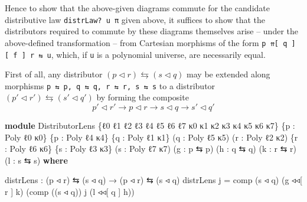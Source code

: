 \documentclass[
  11pt,
  oneside,
  article]{memoir}
\newenvironment{Shaded}{}{}
\newcommand{\KeywordTok}[1]{\textcolor[rgb]{0.00,0.44,0.13}{\textbf{#1}}}
\newcommand{\NormalTok}[1]{#1}
\newcommand{\OtherTok}[1]{\textcolor[rgb]{0.00,0.44,0.13}{#1}}
\theoremstyle{definition}
\theoremstyle{plain}
\newcommand{\0}{\textsf{0}}
\newcommand{\1}{\tn{\textsf{1}}}
\begin{document}
Hence to show that the above-given diagrams commute for the candidate
distributive law \texttt{distrLaw?\ u\ π} given above, it suffices to
show that the distributors required to commute by these diagrams
themselves arise -- under the above-defined transformation -- from
Cartesian morphisms of the form
\texttt{p\ ⇈{[}\ q\ {]}{[}\ f\ {]}\ r\ ⇆\ u}, which, if \texttt{u} is a
polynomial universe, are necessarily equal.

First of all, any distributor
\((p \triangleleft r) \leftrightarrows (s \triangleleft q)\) may be
extended along morphisms
\texttt{p\textquotesingle{}\ ⇆\ p,\ q\ ⇆\ q\textquotesingle{},\ r\textquotesingle{}\ ⇆\ r,\ s\ ⇆\ s\textquotesingle{}}
to a distributor
\((p' \triangleleft r') \leftrightarrows (s' \triangleleft q')\) by
forming the composite \[
p' \triangleleft r' \xrightarrow{} p \triangleleft r \xrightarrow{} s \triangleleft q \xrightarrow{} s' \triangleleft q'
\]

\begin{Shaded}
\begin{Highlighting}[]
\KeywordTok{module}\NormalTok{ DistributorLens }\OtherTok{\{}\NormalTok{ℓ0 ℓ1 ℓ2 ℓ3 ℓ4 ℓ5 ℓ6 ℓ7}
\NormalTok{                        κ0 κ1 κ2 κ3 κ4 κ5 κ6 κ7}\OtherTok{\}}
                       \OtherTok{\{}\NormalTok{p }\OtherTok{:}\NormalTok{ Poly ℓ0 κ0}\OtherTok{\}} \OtherTok{\{}\NormalTok{p\textquotesingle{} }\OtherTok{:}\NormalTok{ Poly ℓ4 κ4}\OtherTok{\}}
                       \OtherTok{\{}\NormalTok{q }\OtherTok{:}\NormalTok{ Poly ℓ1 κ1}\OtherTok{\}} \OtherTok{(}\NormalTok{q\textquotesingle{} }\OtherTok{:}\NormalTok{ Poly ℓ5 κ5}\OtherTok{)}
                       \OtherTok{(}\NormalTok{r }\OtherTok{:}\NormalTok{ Poly ℓ2 κ2}\OtherTok{)} \OtherTok{\{}\NormalTok{r\textquotesingle{} }\OtherTok{:}\NormalTok{ Poly ℓ6 κ6}\OtherTok{\}}
                       \OtherTok{\{}\NormalTok{s }\OtherTok{:}\NormalTok{ Poly ℓ3 κ3}\OtherTok{\}} \OtherTok{(}\NormalTok{s\textquotesingle{} }\OtherTok{:}\NormalTok{ Poly ℓ7 κ7}\OtherTok{)}
                       \OtherTok{(}\NormalTok{g }\OtherTok{:}\NormalTok{ p\textquotesingle{} ⇆ p}\OtherTok{)} \OtherTok{(}\NormalTok{h }\OtherTok{:}\NormalTok{ q ⇆ q\textquotesingle{}}\OtherTok{)} 
                       \OtherTok{(}\NormalTok{k }\OtherTok{:}\NormalTok{ r\textquotesingle{} ⇆ r}\OtherTok{)} \OtherTok{(}\NormalTok{l }\OtherTok{:}\NormalTok{ s ⇆ s\textquotesingle{}}\OtherTok{)} \KeywordTok{where}

\NormalTok{    distrLens }\OtherTok{:} \OtherTok{(}\NormalTok{p ◃ r}\OtherTok{)}\NormalTok{ ⇆ }\OtherTok{(}\NormalTok{s ◃ q}\OtherTok{)} \OtherTok{→} \OtherTok{(}\NormalTok{p\textquotesingle{} ◃ r\textquotesingle{}}\OtherTok{)}\NormalTok{ ⇆ }\OtherTok{(}\NormalTok{s\textquotesingle{} ◃ q\textquotesingle{}}\OtherTok{)}
\NormalTok{    distrLens j }\OtherTok{=} 
\NormalTok{        comp }\OtherTok{(}\NormalTok{s\textquotesingle{} ◃ q\textquotesingle{}}\OtherTok{)} \OtherTok{(}\NormalTok{g ◃◃[ r ] k}\OtherTok{)} 
             \OtherTok{(}\NormalTok{comp }\OtherTok{((}\NormalTok{s\textquotesingle{} ◃ q\textquotesingle{}}\OtherTok{))}\NormalTok{ j }
                   \OtherTok{(}\NormalTok{l ◃◃[ q\textquotesingle{} ] h}\OtherTok{))}
\end{Highlighting}
\end{Shaded}
\end{document}
